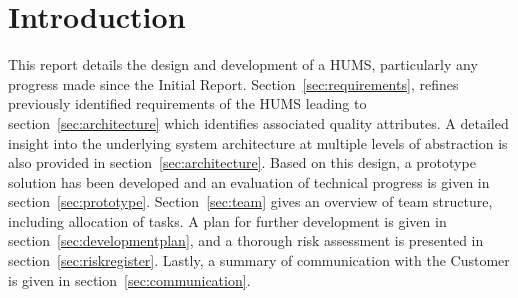 \section{Introduction}
\label{sec:introduction}

This report details the design and development of a HUMS, particularly any progress made since the Initial Report. Section~\ref{sec:requirements}, refines previously identified requirements of the HUMS leading to section~\ref{sec:architecture} which identifies associated quality attributes. A detailed insight into the underlying system architecture at multiple levels of abstraction is also provided in section~\ref{sec:architecture}. Based on this design, a prototype solution has been developed and an evaluation of technical progress is given in section~\ref{sec:prototype}. Section~\ref{sec:team} gives an overview of team structure, including allocation of tasks. A plan for further development is given in section~\ref{sec:developmentplan}, and a thorough risk assessment is presented in section~\ref{sec:riskregister}. Lastly, a summary of communication with the Customer is given in section~\ref{sec:communication}.
